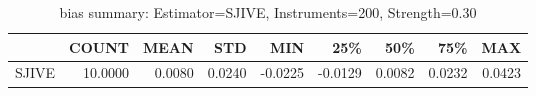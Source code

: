\begin{table}[ht]
\centering
\caption{bias summary: Estimator=SJIVE, Instruments=200, Strength=0.30}
\begin{tabular}{lrrrrrrrr}
\toprule
 & COUNT & MEAN & STD & MIN & 25\% & 50\% & 75\% & MAX \\
\midrule
SJIVE & 10.0000 & 0.0080 & 0.0240 & -0.0225 & -0.0129 & 0.0082 & 0.0232 & 0.0423 \\
\bottomrule
\end{tabular}
\end{table}
